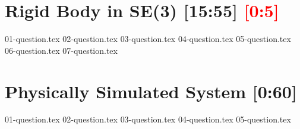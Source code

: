 \documentclass[letterpaper]{article}
\begin{document}
\section{Rigid Body in SE(3) [15:55] \textcolor{red}{[0:5]}}
{01-question.tex}
{02-question.tex}
{03-question.tex}
{04-question.tex}
{05-question.tex}
{06-question.tex}
{07-question.tex}

\section{Physically Simulated System [0:60]}
{01-question.tex}
{02-question.tex}
{03-question.tex}
{04-question.tex}
{05-question.tex}
\end{document}
